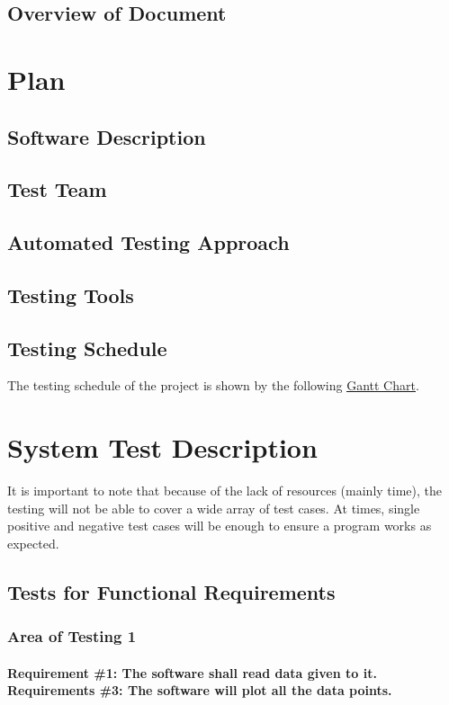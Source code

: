 \documentclass[12pt, titlepage]{article}
\begin{document}
\subsection{Overview of Document}
\section{Plan}
	
\subsection{Software Description}
\subsection{Test Team}
\subsection{Automated Testing Approach}
\subsection{Testing Tools}
\subsection{Testing Schedule}
The testing schedule of the project is shown by the following
 \href{run:../DevelopmentPlan/GanttChart.gan} {\underline{Gantt Chart}}.
\section{System Test Description}

It is important to note that because of the lack of resources (mainly time), the testing will not be able to cover a wide array of test cases. At times, single positive and negative test cases will be enough to ensure a program works as expected. 	
\subsection{Tests for Functional Requirements}

\subsubsection{Area of Testing 1}		
	\label{sec:3.1.1}
	\paragraph{Requirement \#1: The software shall read data given to it. \\ Requirements \#3: The software will plot all the data points.}
\end{document}
